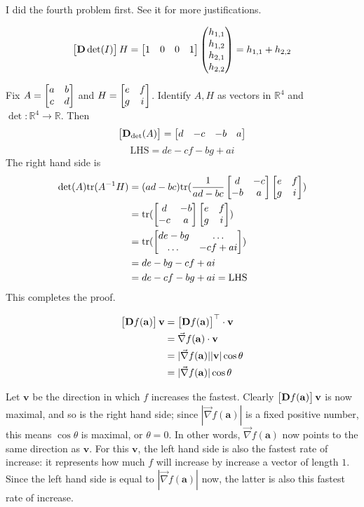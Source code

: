 \documentclass{homework}
\begin{document}
\begin{problem}{3}
I did the fourth problem first. See it for more justifications.

$$\begin{bmatrix}\mathbf{D}\det(I)\end{bmatrix}H = \begin{bmatrix}1&0&0&1\end{bmatrix}\begin{pmatrix}h_{1,1}\\h_{1,2}\\h_{2,1}\\h_{2,2}\end{pmatrix}=h_{1,1}+h_{2,2}$$
\end{problem}

\begin{problem}{4}
\def \tr{\mathrm{tr}}

Fix $A = \begin{bmatrix}a&b\\c&d\end{bmatrix}$ and $H = \begin{bmatrix}e&f\\g&i\end{bmatrix}$. Identify $A, H$ as vectors in $\mathbb{R}^4$ and $\det : \mathbb{R}^4 \to \mathbb{R}$. Then
$$\begin{bmatrix}\mathbf{D}_{\det}(A)\end{bmatrix} = \begin{bmatrix}d&-c&-b&a\end{bmatrix}$$
$$\mathrm{LHS} = de-cf-bg+ai$$
The right hand side is
\begin{align*}
  \det(A)\tr(A^{-1}H) &= (ad-bc)\tr(\frac{1}{ad-bc}\bmat{d&-c\\-b&a}\bmat{e&f\\g&i}) \\
                      &= \tr(\bmat{d&-b\\-c&a}\bmat{e&f\\g&i}) \\
                      &= \tr(\bmat{de-bg&\dots\\\dots&-cf+ai}) \\
                      &= de-bg-cf+ai \\
                      &= de-cf-bg+ai = \mathrm{LHS}
\end{align*}
This completes the proof. \QED
\end{problem}

\begin{problem}{5}
\begin{align*}
\begin{bmatrix}\mathbf{D}f(\mathbf{a})\end{bmatrix}\mathbf{v} &=
\begin{bmatrix}\mathbf{D}f(\mathbf{a})\end{bmatrix}^{\top} \cdot \mathbf{v} \\ &=
\vec{\nabla}f(\mathbf{a}) \cdot \mathbf{v} \\ &=
|\vec{\nabla}f(\mathbf{a})||\mathbf{v}|\cos\theta \\ &=
|\vec{\nabla}f(\mathbf{a})|\cos\theta
\end{align*}

Let $\mathbf{v}$ be the direction in which $f$ increases the fastest. Clearly $\begin{bmatrix}\mathbf{D}f(\mathbf{a})\end{bmatrix}\mathbf{v}$ is now maximal, and so is the right hand side; since $|\vec{\nabla}f(\mathbf{a})|$ is a fixed positive number, this means $\cos\theta$ is maximal, or $\theta = 0$. In other words, $\vec{\nabla}f(\mathbf{a})$ now points to the same direction as $\mathbf{v}$. For this $\mathbf{v}$, the left hand side is also the fastest rate of increase: it represents how much $f$ will increase by increase a vector of length $1$. Since the left hand side is equal to $|\vec{\nabla}f(\mathbf{a})|$ now, the latter is also this fastest rate of increase. \QED
\end{problem}
\end{document}
